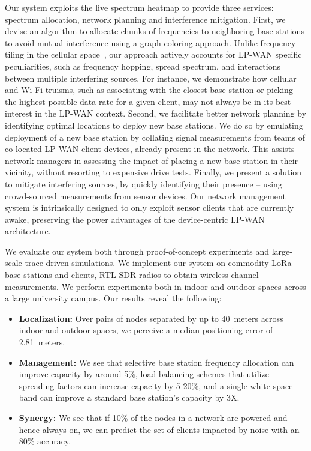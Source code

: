 Our system exploits the live spectrum heatmap to provide three services: spectrum allocation, network planning and interference mitigation. First, we devise an algorithm to allocate chunks of frequencies to neighboring base stations to avoid mutual interference using a graph-coloring approach. Unlike frequency tiling in the cellular space~\cite{mcdiarmid2000channel, khanna1998wireless}, our approach actively accounts for LP-WAN specific peculiarities, such as frequency hopping, spread spectrum, and interactions between multiple interfering sources. For instance, we demonstrate how cellular and Wi-Fi truisms, such as associating with the closest base station or picking the highest possible data rate for a given client, may not always be in its best interest in the LP-WAN context. Second, we facilitate better network planning by identifying optimal locations to deploy new base stations. We do so by emulating deployment of a new base station by collating signal measurements from teams of co-located LP-WAN client devices, already present in the network. This assists network managers in assessing the impact of placing a new base station in their vicinity, without resorting to expensive drive tests. Finally, we present a solution to mitigate interfering sources, by quickly identifying their presence -- using crowd-sourced measurements from sensor devices. Our network management system is intrinsically designed to only exploit sensor clients that are currently awake, preserving the power advantages of the device-centric LP-WAN architecture. 

We evaluate our system both through proof-of-concept experiments and large-scale trace-driven simulations. We implement our system on commodity LoRa base stations and clients, RTL-SDR radios \cite{rtlsdr} to obtain wireless channel measurements. We perform experiments both in indoor and outdoor spaces across a large university campus. Our results reveal the following:
\begin{itemize}
\item \textbf{Localization: } Over pairs of nodes separated by up to 40~meters across indoor and outdoor spaces, we perceive a median positioning error of 2.81~meters. 
\item \textbf{Management: } We see that  selective base station frequency allocation can improve capacity by around 5\%, load balancing schemes that utilize spreading factors can increase capacity by 5-20\%, and a single white space band can improve a standard base station's capacity by 3X.
\item \textbf{Synergy: } We see that if 10\% of the nodes in a network are powered and hence always-on, we can  predict the set of clients impacted by noise with an 80\% accuracy.
\end{itemize}

